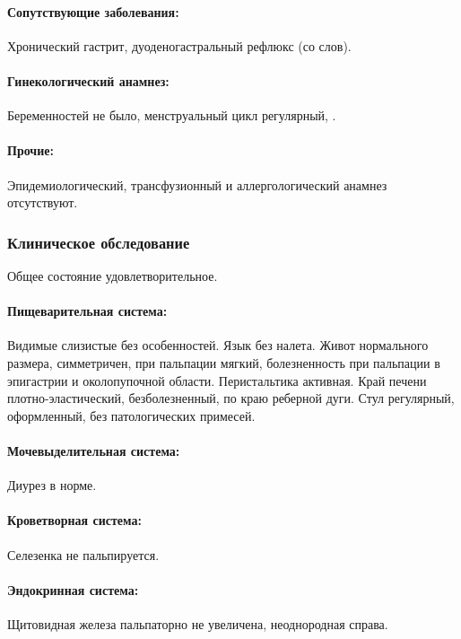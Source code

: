 \documentclass[a4paper,14pt]{extarticle}
\begin{document}
\paragraph{Сопутствующие заболевания:} Хронический гастрит, дуоденогастральный рефлюкс (со слов).

\paragraph{Гинекологический анамнез:} Беременностей не было, менструальный цикл регулярный, .

\paragraph{Прочие:} Эпидемиологический, трансфузионный и аллергологический анамнез отсутствуют.

\subsubsection*{Клиническое обследование}

Общее состояние удовлетворительное.

\paragraph{Пищеварительная система:} Видимые слизистые без особенностей. Язык без налета. Живот нормального размера, симметричен, при пальпации мягкий, болезненность при пальпации в эпигастрии и околопупочной области. Перистальтика активная. Край печени плотно-эластический, безболезненный, по краю реберной дуги. Стул регулярный, оформленный, без патологических примесей.

\paragraph{Мочевыделительная система:} Диурез в норме.

\paragraph{Кроветворная система:} Селезенка не пальпируется.

\paragraph{Эндокринная система:} Щитовидная железа пальпаторно не увеличена, неоднородная справа.
\end{document}
